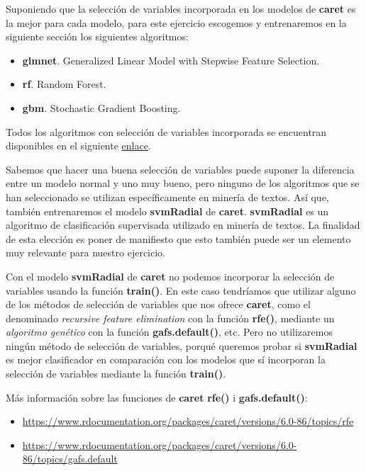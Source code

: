 \documentclass[]{article}
\begin{document}
Suponiendo que la selección de variables incorporada en los modelos de \textbf{caret} es la mejor para cada modelo, para este ejercicio escogemos y entrenaremos en la siguiente sección los siguientes algoritmos:

\begin{itemize}
	\item \textbf{glmnet}. Generalized Linear Model with Stepwise Feature Selection.
	\item \textbf{rf}. Random Forest.
	\item \textbf{gbm}. Stochastic Gradient Boosting.
\end{itemize}

Todos los algoritmos con selección de variables incorporada se encuentran disponibles en el siguiente \href{http://topepo.github.io/caret/feature-selection-overview.html}{\color{blue}enlace}.

Sabemos que hacer una buena selección de variables puede suponer la diferencia entre un modelo normal y uno muy bueno, pero ninguno de los algoritmos que se han seleccionado se utilizan específicamente en minería de textos. Así que, también entrenaremos el modelo \textbf{svmRadial} de \textbf{caret}. \textbf{svmRadial} es un algoritmo de clasificación supervisada utilizado en minería de textos. La finalidad de esta elección es poner de manifiesto que esto también puede ser un elemento muy relevante para nuestro ejercicio.

Con el modelo \textbf{svmRadial} de \textbf{caret} no podemos incorporar la selección de variables usando la función \textbf{train()}. En este caso tendríamos que utilizar alguno de los métodos de selección de variables que nos ofrece \textbf{caret}, como el denominado \textit{recursive feature elimination} con la función \textbf{rfe()}, mediante un \textit{algoritmo genético} con la función \textbf{gafs.default()}, etc. Pero no utilizaremos ningún método de selección de variables, porqué queremos probar si \textbf{svmRadial} es mejor clasificador en comparación con los modelos que sí incorporan la selección de variables mediante la función \textbf{train()}. 

\begin{tcolorbox}
	Más información sobre las funciones de \textbf{caret} \textbf{rfe()} i \textbf{gafs.default()}:
	\begin{itemize}
		\item \url{https://www.rdocumentation.org/packages/caret/versions/6.0-86/topics/rfe} 
		\item \url{https://www.rdocumentation.org/packages/caret/versions/6.0-86/topics/gafs.default}
	\end{itemize}
\end{tcolorbox}
\end{document}

